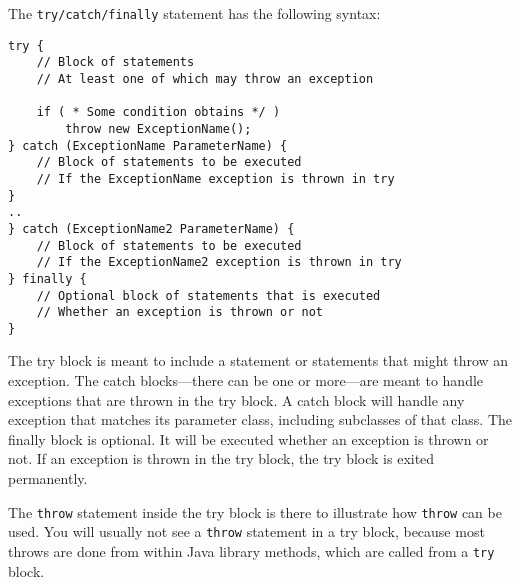 
\noindent The {\tt try/catch/finally} statement has the following syntax:

\begin{jjjlisting}
\begin{lstlisting}
try {
    // Block of statements
    // At least one of which may throw an exception

    if ( * Some condition obtains */ )
        throw new ExceptionName();
} catch (ExceptionName ParameterName) {
    // Block of statements to be executed
    // If the ExceptionName exception is thrown in try
}
..
} catch (ExceptionName2 ParameterName) {
    // Block of statements to be executed
    // If the ExceptionName2 exception is thrown in try
} finally {
    // Optional block of statements that is executed
    // Whether an exception is thrown or not
}
\end{lstlisting}
\end{jjjlisting}

\noindent The try block is meant to include a statement or
statements that might throw an exception.  The catch blocks---there
can be one or more---are meant to handle exceptions that are thrown
in the try block.  A catch block will handle any exception that
matches its parameter class, including subclasses of that class.
The finally block is optional.  It will be executed whether
an exception is thrown or not.  If an exception is thrown in
the try block, the try block is exited permanently.

The {\tt throw} statement inside the try block is there
to illustrate how {\tt throw} can be used.  You will
usually not see a {\tt throw} statement in a try block,
because most throws are done from within Java library methods,
which are called from a {\tt try} block.


